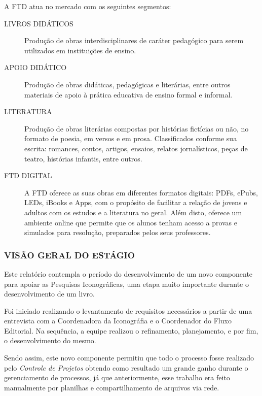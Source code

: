 \documentclass[
  12pt,				%
  openany,
  oneside,
  a4paper,			%
  english,			%
  brazil
]{article}
\numberwithin{figure}{section}
\numberwithin{table}{section}
\begin{document}
A FTD atua no mercado com os seguintes segmentos:

\begin{description}
	\item[LIVROS DIDÁTICOS] Produção de obras interdisciplinares de caráter pedagógico para serem utilizados em instituições de ensino. 
	\item[APOIO DIDÁTICO]   Produção de obras didáticas, pedagógicas e literárias, entre outros materiais de apoio à prática educativa de ensino formal e informal. 
	\item[LITERATURA]       Produção de obras literárias compostas por histórias fictícias ou não, no formato de poesia, em versos e em prosa. Classificados conforme sua escrita: romances, contos, artigos, ensaios, relatos jornalísticos, peças de teatro, histórias infantis, entre outros.
	\item[FTD DIGITAL]      A FTD oferece as suas obras em diferentes formatos digitais: PDFs, ePubs, LEDs, iBooks e Apps, com o propósito de facilitar a relação de jovens e adultos com os estudos e a literatura no geral. Além disto, oferece um ambiente online que permite que os alunos tenham acesso a provas e simulados para resolução, preparados pelos seus professores.
\end{description}


\subsubsection{VISÃO GERAL DO ESTÁGIO}

Este relatório contempla o período do desenvolvimento de um novo componente para apoiar as Pesquisas Iconográficas, uma etapa muito importante durante o desenvolvimento de um livro.

Foi iniciado realizando o levantamento de requisitos necessários a partir de uma entrevista com a Coordenadora da Iconográfia e o Coordenador do Fluxo Editorial. Na sequência, a equipe realizou o refinamento, planejamento, e por fim, o desenvolvimento do mesmo.

Sendo assim, este novo componente permitiu que todo o processo fosse realizado pelo \textit{Controle de Projetos} obtendo como resultado um grande ganho durante o gerenciamento de processos, já que anteriormente, esse trabalho era feito manualmente por planilhas e compartilhamento de arquivos via rede.
\end{document}
